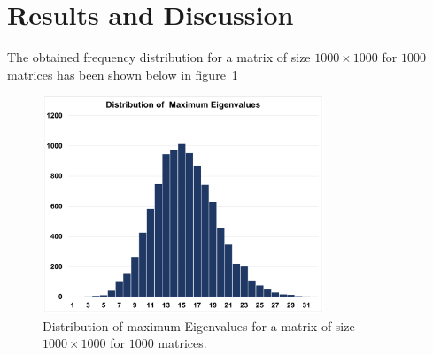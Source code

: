 \documentclass[11pt, oneside]{article}
\begin{document}
	
\section{Results and Discussion}
The obtained frequency distribution for a matrix of size $1000 \times 1000$ for $1000$ matrices has been shown below in figure~\ref{fig:dist}
 \begin{figure}[h]
		\centering
		\includegraphics[width=0.75\textwidth]{Figures/distribution.pdf}
		\caption{Distribution of maximum Eigenvalues for a matrix of size $1000 \times 1000$ for $1000$ matrices.}
		\label{fig:dist}
	\end{figure}
\end{document}
